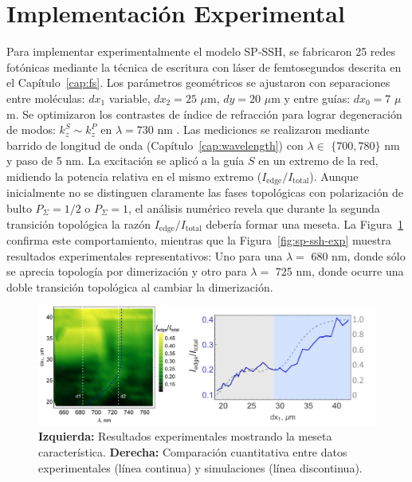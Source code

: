 \section{Implementación Experimental}
Para implementar experimentalmente el modelo SP-SSH, se fabricaron 25 redes fotónicas mediante la técnica de escritura con láser de femtosegundos descrita en el Capítulo~\ref{cap:fs}. Los parámetros geométricos se ajustaron con separaciones entre moléculas: $dx_1$ variable, $dx_2 = 25$ $\mu$m, $dy = 20$ $\mu$m y entre guías: $dx_0 = 7$ $\mu$m. Se optimizaron los contrastes de índice de refracción para lograr degeneración de modos: $k_z^S \sim k_z^P$ en $\lambda = 730$ nm \cite{interorbital}. Las mediciones se realizaron mediante barrido de longitud de onda (Capítulo~\ref{cap:wavelength}) con $\lambda \in$ $\{700, 780\}$ nm y paso de 5 nm. La excitación se aplicó a la guía $S$ en un extremo de la red, midiendo la potencia relativa en el mismo extremo ($I_{\text{edge}}/I_{\text{total}}$). Aunque inicialmente no se distinguen claramente las fases topológicas con polarización de bulto $P_\Sigma=1/2$ o $P_\Sigma=1$, el análisis numérico revela que durante la segunda transición topológica la razón $I_{\text{edge}}/I_{\text{total}}$ debería formar una meseta. La Figura~\ref{fig:sp-ssh-num} confirma este comportamiento, mientras que la Figura~\ref{fig:sp-ssh-exp} muestra resultados experimentales representativos: Uno para una $\lambda =$ 680 nm, donde sólo se aprecia topología por dimerización y otro para $\lambda =$ 725 nm, donde ocurre una doble transición topológica al cambiar la dimerización.

\begin{figure}[H]
	\centering
	\includegraphics[width=0.8\linewidth]{media/sp-ssh-exp-num.png}
	\caption[Análisis numérico-experimental del modelo SP-SSH]{
		\textbf{Izquierda:} Resultados experimentales mostrando la meseta característica. 
		\textbf{Derecha:} Comparación cuantitativa entre datos experimentales (línea continua) y simulaciones (línea discontinua).
		\label{fig:sp-ssh-num}}
\end{figure}

